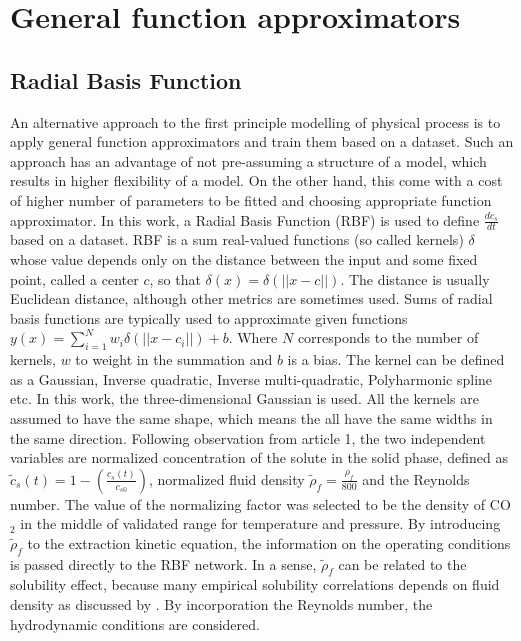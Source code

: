 \documentclass[../Article_Model_Parameters.tex]{subfiles}
\begin{document}
	
	\section{General function approximators} \label{CH: RBF}
	
	\subsection{Radial Basis Function}
	
	An alternative approach to the first principle modelling of physical process is to apply general function approximators and train them based on a dataset. Such an approach has an advantage of not pre-assuming a structure of a model, which results in higher flexibility of a model. On the other hand, this come with a cost of higher number of parameters to be fitted and choosing appropriate function approximator. In this work, a Radial Basis Function (RBF) is used to define $\frac{dc_s}{dt}$ based on a dataset. RBF is a sum real-valued functions (so called kernels) $\delta$ whose value depends only on the distance between the input and some fixed point, called a center $c$, so that $\delta(x) = \delta(||x-c||)$. The distance is usually Euclidean distance, although other metrics are sometimes used. Sums of radial basis functions are typically used to approximate given functions $y(x) = \sum_{i=1}^{N} w_i \delta(||x-c_i||) + b$. Where $N$ corresponds to the number of kernels, $w$ to weight in the summation and $b$ is a bias. The kernel can be defined as a Gaussian, Inverse quadratic, Inverse multi-quadratic, Polyharmonic spline etc. In this work, the three-dimensional Gaussian is used. All the kernels are assumed to have the same shape, which means the all have the same widths in the same direction.
	Following observation from {\color{red}article 1}, the two independent variables are normalized concentration of the solute in the solid phase, defined as $\tilde{c}_s(t) = 1 - \left(\frac{c_s(t)}{c_{s0}}\right)$, normalized fluid density $\tilde{\rho}_f = \frac{\rho_f}{800}$ and the Reynolds number. The value of the normalizing factor was selected to be the density of CO$_2$ in the middle of validated range for temperature and pressure. By introducing $\tilde{\rho}_f$ to the extraction kinetic equation, the information on the operating conditions is passed directly to the RBF network. In a sense, $\tilde{\rho}_f$ can be related to the solubility effect, because many empirical solubility correlations depends on fluid density as discussed by \citet{Antonie2019}. By incorporation the Reynolds number, the hydrodynamic conditions are considered.
	
\end{document}
